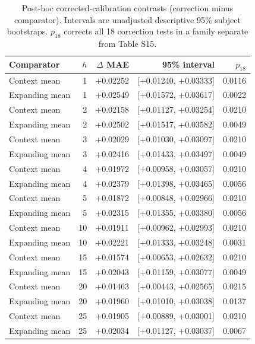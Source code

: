 \begin{table}[!ht]
\centering\small
\setlength{\tabcolsep}{5pt}
\caption{Post-hoc corrected-calibration contrasts (correction minus comparator). Intervals are unadjusted descriptive 95\% subject bootstraps. $p_{18}$ corrects all 18 correction tests in a family separate from Table S15.}
\label{tab:supp_calibration_correction_pairs}
\begin{tabular}{lrrrr}
\toprule
Comparator & $h$ & $\Delta$ MAE & 95\% interval & $p_{18}$ \\
\midrule
Context mean & 1 & +0.02252 & [+0.01240, +0.03333] & 0.0116 \\
Expanding mean & 1 & +0.02549 & [+0.01572, +0.03617] & 0.0022 \\
Context mean & 2 & +0.02158 & [+0.01127, +0.03254] & 0.0210 \\
Expanding mean & 2 & +0.02502 & [+0.01517, +0.03582] & 0.0049 \\
Context mean & 3 & +0.02029 & [+0.01030, +0.03097] & 0.0210 \\
Expanding mean & 3 & +0.02416 & [+0.01433, +0.03497] & 0.0049 \\
Context mean & 4 & +0.01972 & [+0.00958, +0.03057] & 0.0210 \\
Expanding mean & 4 & +0.02379 & [+0.01398, +0.03465] & 0.0056 \\
Context mean & 5 & +0.01872 & [+0.00848, +0.02966] & 0.0210 \\
Expanding mean & 5 & +0.02315 & [+0.01355, +0.03380] & 0.0056 \\
Context mean & 10 & +0.01911 & [+0.00962, +0.02993] & 0.0210 \\
Expanding mean & 10 & +0.02221 & [+0.01333, +0.03248] & 0.0031 \\
Context mean & 15 & +0.01574 & [+0.00653, +0.02632] & 0.0210 \\
Expanding mean & 15 & +0.02043 & [+0.01159, +0.03077] & 0.0049 \\
Context mean & 20 & +0.01463 & [+0.00443, +0.02565] & 0.0215 \\
Expanding mean & 20 & +0.01960 & [+0.01010, +0.03038] & 0.0137 \\
Context mean & 25 & +0.01905 & [+0.00889, +0.03001] & 0.0210 \\
Expanding mean & 25 & +0.02034 & [+0.01127, +0.03037] & 0.0067 \\
\bottomrule\end{tabular}\end{table}
